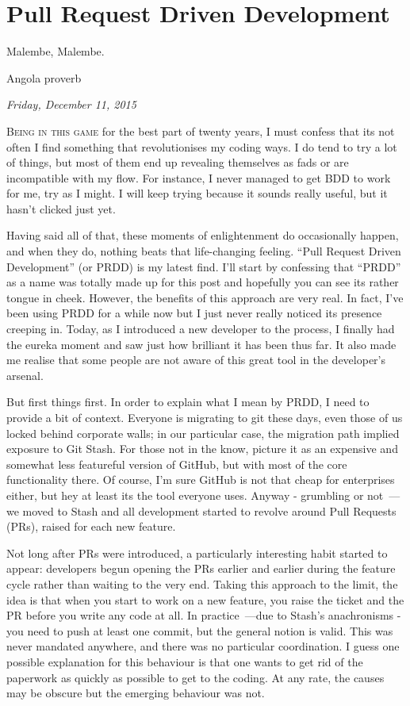 \documentclass{book}
\begin{document}
\chapter{Pull Request Driven Development}

\epigraph{Malembe, Malembe.}{Angola proverb}

\begin{flushright}
  \emph{Friday, December 11, 2015}
\end{flushright}

\lettrine{B}{eing in this game} for the best part of twenty years, I
must confess that its not often I find something that revolutionises
my coding ways. I do tend to try a lot of things, but most of them end
up revealing themselves as fads or are incompatible with my flow. For
instance, I never managed to get BDD to work for me, try as I might. I
will keep trying because it sounds really useful, but it hasn't
clicked just yet.

Having said all of that, these moments of enlightenment do
occasionally happen, and when they do, nothing beats that
life-changing feeling. ``Pull Request Driven Development'' (or PRDD)
is my latest find. I'll start by confessing that ``PRDD'' as a name
was totally made up for this post and hopefully you can see its rather
tongue in cheek. However, the benefits of this approach are very
real. In fact, I've been using PRDD for a while now but I just never
really noticed its presence creeping in. Today, as I introduced a new
developer to the process, I finally had the eureka moment and saw just
how brilliant it has been thus far. It also made me realise that some
people are not aware of this great tool in the developer's arsenal.

But first things first. In order to explain what I mean by PRDD, I
need to provide a bit of context. Everyone is migrating to git these
days, even those of us locked behind corporate walls; in our
particular case, the migration path implied exposure to Git Stash. For
those not in the know, picture it as an expensive and somewhat less
featureful version of GitHub, but with most of the core functionality
there. Of course, I'm sure GitHub is not that cheap for enterprises
either, but hey at least its the tool everyone uses. Anyway -
grumbling or not~---we moved to Stash and all development started to
revolve around Pull Requests (PRs), raised for each new feature.

Not long after PRs were introduced, a particularly interesting habit
started to appear: developers begun opening the PRs earlier and
earlier during the feature cycle rather than waiting to the very
end. Taking this approach to the limit, the idea is that when you
start to work on a new feature, you raise the ticket and the PR before
you write any code at all. In practice~---due to Stash's anachronisms -
you need to push at least one commit, but the general notion is
valid. This was never mandated anywhere, and there was no particular
coordination. I guess one possible explanation for this behaviour is
that one wants to get rid of the paperwork as quickly as possible to
get to the coding. At any rate, the causes may be obscure but the
emerging behaviour was not.
\end{document}
